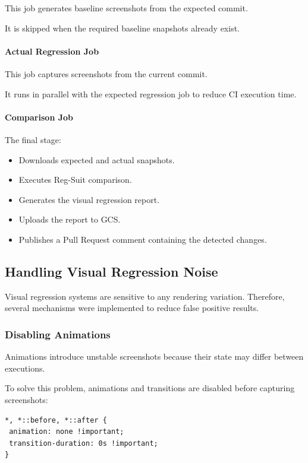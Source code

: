 This job generates baseline screenshots from the expected commit.

It is skipped when the required baseline snapshots already exist.


\paragraph{Actual Regression Job}

This job captures screenshots from the current commit.

It runs in parallel with the expected regression job to reduce CI execution time.


\paragraph{Comparison Job}

The final stage:

\begin{itemize}
    \item Downloads expected and actual snapshots.
    \item Executes Reg-Suit comparison.
    \item Generates the visual regression report.
    \item Uploads the report to GCS.
    \item Publishes a Pull Request comment containing the detected changes.
\end{itemize}


\subsection{Handling Visual Regression Noise}

Visual regression systems are sensitive to any rendering variation. Therefore, several mechanisms were implemented to reduce false positive results.


\subsubsection{Disabling Animations}

Animations introduce unstable screenshots because their state may differ between executions.

To solve this problem, animations and transitions are disabled before capturing screenshots:

\begin{lstlisting}[]
*, *::before, *::after {
 animation: none !important;
 transition-duration: 0s !important;
}
\end{lstlisting}

